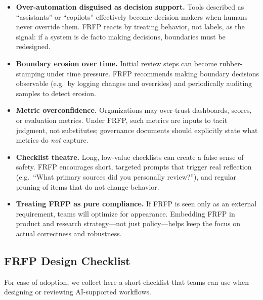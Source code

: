 \begin{itemize}
  \item \textbf{Over-automation disguised as decision support.}
  Tools described as ``assistants'' or ``copilots'' effectively become decision-makers when humans never override them.
  FRFP reacts by treating behavior, not labels, as the signal: if a system is de facto making decisions, boundaries must be redesigned.

  \item \textbf{Boundary erosion over time.}
  Initial review steps can become rubber-stamping under time pressure.
  FRFP recommends making boundary decisions observable (e.g.\ by logging changes and overrides) and periodically auditing samples to detect erosion.

  \item \textbf{Metric overconfidence.}
  Organizations may over-trust dashboards, scores, or evaluation metrics.
  Under FRFP, such metrics are inputs to tacit judgment, not substitutes; governance documents should explicitly state what metrics do \emph{not} capture.

  \item \textbf{Checklist theatre.}
  Long, low-value checklists can create a false sense of safety.
  FRFP encourages short, targeted prompts that trigger real reflection (e.g.\ ``What primary sources did you personally review?''), and regular pruning of items that do not change behavior.

  \item \textbf{Treating FRFP as pure compliance.}
  If FRFP is seen only as an external requirement, teams will optimize for appearance.
  Embedding FRFP in product and research strategy---not just policy---helps keep the focus on actual correctness and robustness.
\end{itemize}

\subsection{FRFP Design Checklist}

For ease of adoption, we collect here a short checklist that teams can use when designing or reviewing AI-supported workflows.

